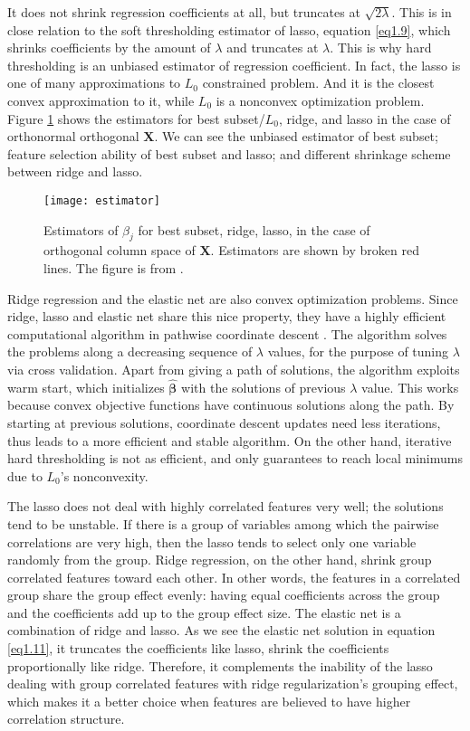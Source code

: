It does not shrink regression coefficients at all, but truncates at $\sqrt{2\lambda}$. This is in close relation to the soft thresholding estimator of lasso, equation \eqref{eq1.9}, which shrinks coefficients by the amount of $\lambda$ and truncates at $\lambda$. This is why hard thresholding is an unbiased estimator of regression coefficient. In fact, the lasso is one of many approximations to $L_0$ constrained problem. And it is the closest convex approximation to it, while $L_0$ is a nonconvex optimization problem. Figure \ref{fig:estimators} shows the estimators for best subset/$L_0$, ridge, and lasso in the case of orthonormal orthogonal $\bm{X}$. We can see the unbiased estimator of best subset; feature selection ability of best subset and lasso; and different shrinkage scheme between ridge and lasso.
\begin{figure}[tbh]
  \centering
  \texttt{[image: estimator]}
  \caption[Estimators of $\beta_j$ in the case of orthonormal columns of $\bm{X}$]{
    Estimators of $\beta_j$ for best subset, ridge, lasso, in the case of orthogonal column space of $\bm{X}$. Estimators are shown by broken red lines. The figure is from \cite{hastie2009elements}.
  }
  \label{fig:estimators}
\end{figure}

Ridge regression and the elastic net are also convex optimization problems. Since ridge, lasso and elastic net share this nice property, they have a highly efficient computational algorithm in pathwise coordinate descent \citep{friedman2007pathwise}. The algorithm solves the problems along a decreasing sequence of $\lambda$ values, for the purpose of tuning $\lambda$ via cross validation. Apart from giving a path of solutions, the algorithm exploits warm start, which initializes $\hat{\bm{\beta}}$ with the solutions of previous $\lambda$ value. This works because convex objective functions have continuous solutions along the path. By starting at previous solutions, coordinate descent updates need less iterations, thus leads to a more efficient and stable algorithm. On the other hand, iterative hard thresholding is not as efficient, and only guarantees to reach local minimums due to $L_0$'s nonconvexity. 

The lasso does not deal with highly correlated features very well; the solutions tend to be unstable. If there is a group of variables among which the pairwise correlations are very high, then the lasso tends to select only one variable randomly from the group. Ridge regression, on the other hand, shrink group correlated features toward each other. In other words, the features in a correlated group share the group effect evenly: having equal coefficients across the group and the coefficients add up to the group effect size. The elastic net is a combination of ridge and lasso. As we see the elastic net solution in equation \eqref{eq1.11}, it truncates the coefficients like lasso, shrink the coefficients proportionally like ridge. Therefore, it complements the inability of the lasso dealing with group correlated features with ridge regularization's grouping effect, which makes it a better choice when features are believed to have higher correlation structure.

